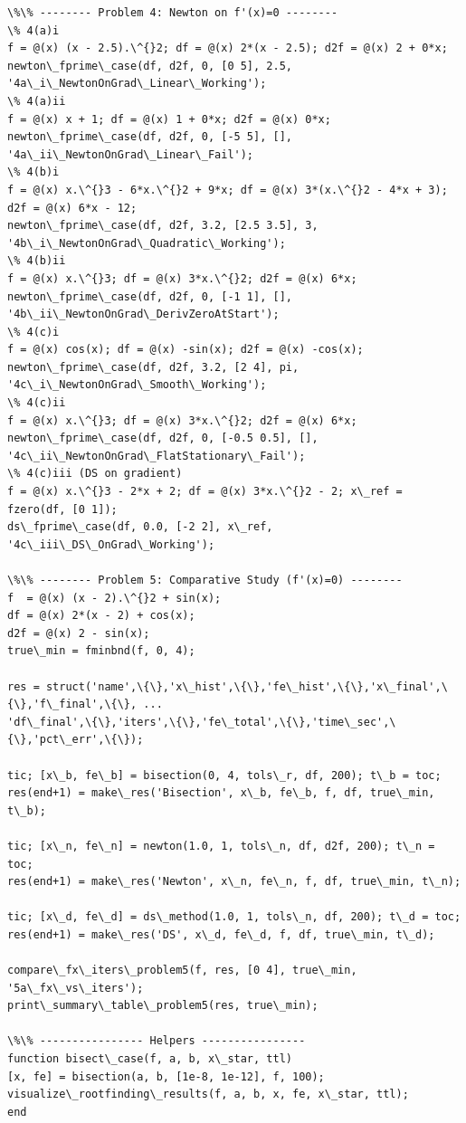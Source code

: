 \documentclass[11pt]{article}
\begin{document}
\begin{lstlisting}[basicstyle=\ttfamily\small]
\%\% -------- Problem 4: Newton on f'(x)=0 --------
\% 4(a)i
f = @(x) (x - 2.5).\^{}2; df = @(x) 2*(x - 2.5); d2f = @(x) 2 + 0*x;
newton\_fprime\_case(df, d2f, 0, [0 5], 2.5, '4a\_i\_NewtonOnGrad\_Linear\_Working');
\% 4(a)ii
f = @(x) x + 1; df = @(x) 1 + 0*x; d2f = @(x) 0*x;
newton\_fprime\_case(df, d2f, 0, [-5 5], [], '4a\_ii\_NewtonOnGrad\_Linear\_Fail');
\% 4(b)i
f = @(x) x.\^{}3 - 6*x.\^{}2 + 9*x; df = @(x) 3*(x.\^{}2 - 4*x + 3); d2f = @(x) 6*x - 12;
newton\_fprime\_case(df, d2f, 3.2, [2.5 3.5], 3, '4b\_i\_NewtonOnGrad\_Quadratic\_Working');
\% 4(b)ii
f = @(x) x.\^{}3; df = @(x) 3*x.\^{}2; d2f = @(x) 6*x;
newton\_fprime\_case(df, d2f, 0, [-1 1], [], '4b\_ii\_NewtonOnGrad\_DerivZeroAtStart');
\% 4(c)i
f = @(x) cos(x); df = @(x) -sin(x); d2f = @(x) -cos(x);
newton\_fprime\_case(df, d2f, 3.2, [2 4], pi, '4c\_i\_NewtonOnGrad\_Smooth\_Working');
\% 4(c)ii
f = @(x) x.\^{}3; df = @(x) 3*x.\^{}2; d2f = @(x) 6*x;
newton\_fprime\_case(df, d2f, 0, [-0.5 0.5], [], '4c\_ii\_NewtonOnGrad\_FlatStationary\_Fail');
\% 4(c)iii (DS on gradient)
f = @(x) x.\^{}3 - 2*x + 2; df = @(x) 3*x.\^{}2 - 2; x\_ref = fzero(df, [0 1]);
ds\_fprime\_case(df, 0.0, [-2 2], x\_ref, '4c\_iii\_DS\_OnGrad\_Working');

\%\% -------- Problem 5: Comparative Study (f'(x)=0) --------
f  = @(x) (x - 2).\^{}2 + sin(x);
df = @(x) 2*(x - 2) + cos(x);
d2f = @(x) 2 - sin(x);
true\_min = fminbnd(f, 0, 4);

res = struct('name',\{\},'x\_hist',\{\},'fe\_hist',\{\},'x\_final',\{\},'f\_final',\{\}, ...
'df\_final',\{\},'iters',\{\},'fe\_total',\{\},'time\_sec',\{\},'pct\_err',\{\});

tic; [x\_b, fe\_b] = bisection(0, 4, tols\_r, df, 200); t\_b = toc;
res(end+1) = make\_res('Bisection', x\_b, fe\_b, f, df, true\_min, t\_b);

tic; [x\_n, fe\_n] = newton(1.0, 1, tols\_n, df, d2f, 200); t\_n = toc;
res(end+1) = make\_res('Newton', x\_n, fe\_n, f, df, true\_min, t\_n);

tic; [x\_d, fe\_d] = ds\_method(1.0, 1, tols\_n, df, 200); t\_d = toc;
res(end+1) = make\_res('DS', x\_d, fe\_d, f, df, true\_min, t\_d);

compare\_fx\_iters\_problem5(f, res, [0 4], true\_min, '5a\_fx\_vs\_iters');
print\_summary\_table\_problem5(res, true\_min);

\%\% ---------------- Helpers ----------------
function bisect\_case(f, a, b, x\_star, ttl)
[x, fe] = bisection(a, b, [1e-8, 1e-12], f, 100);
visualize\_rootfinding\_results(f, a, b, x, fe, x\_star, ttl);
end


\end{lstlisting}
\end{document}
